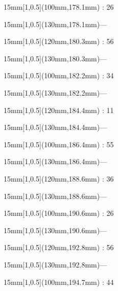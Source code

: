 \documentclass[a4paper]{memoir}
\begin{document}
\begin{textblock*}{15mm}[1,0.5](100mm,178.1mm) : 26\end{textblock*}
\begin{textblock*}{15mm}[1,0.5](130mm,178.1mm)\flushright —\end{textblock*}
\begin{textblock*}{15mm}[1,0.5](120mm,180.3mm) : 56\end{textblock*}
\begin{textblock*}{15mm}[1,0.5](130mm,180.3mm)\flushright —\end{textblock*}
\begin{textblock*}{15mm}[1,0.5](100mm,182.2mm) : 34\end{textblock*}
\begin{textblock*}{15mm}[1,0.5](130mm,182.2mm)\flushright —\end{textblock*}
\begin{textblock*}{15mm}[1,0.5](120mm,184.4mm) : 11\end{textblock*}
\begin{textblock*}{15mm}[1,0.5](130mm,184.4mm)\flushright —\end{textblock*}
\begin{textblock*}{15mm}[1,0.5](100mm,186.4mm) : 55\end{textblock*}
\begin{textblock*}{15mm}[1,0.5](130mm,186.4mm)\flushright —\end{textblock*}
\begin{textblock*}{15mm}[1,0.5](120mm,188.6mm) : 36\end{textblock*}
\begin{textblock*}{15mm}[1,0.5](130mm,188.6mm)\flushright —\end{textblock*}
\begin{textblock*}{15mm}[1,0.5](100mm,190.6mm) : 26\end{textblock*}
\begin{textblock*}{15mm}[1,0.5](130mm,190.6mm)\flushright —\end{textblock*}
\begin{textblock*}{15mm}[1,0.5](120mm,192.8mm) : 56\end{textblock*}
\begin{textblock*}{15mm}[1,0.5](130mm,192.8mm)\flushright —\end{textblock*}
\begin{textblock*}{15mm}[1,0.5](100mm,194.7mm) : 44\end{textblock*}
\end{document}
